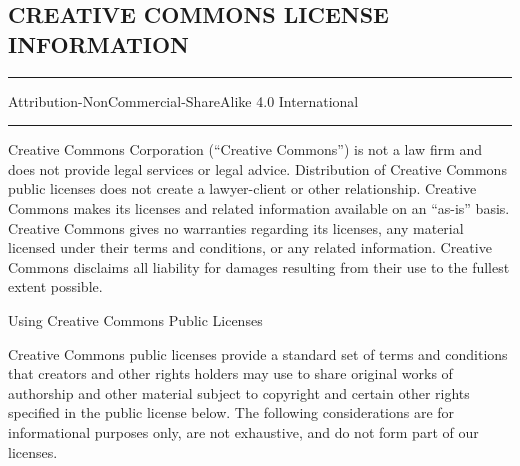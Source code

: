 \documentclass[
]{scrbook}
\begin{document}
\hypertarget{creative-commons-license-information}{%
\subsection{CREATIVE COMMONS LICENSE
INFORMATION}\label{creative-commons-license-information}}

\begin{center}\rule{0.5\linewidth}{0.5pt}\end{center}

Attribution-NonCommercial-ShareAlike 4.0 International

\begin{center}\rule{0.5\linewidth}{0.5pt}\end{center}

Creative Commons Corporation (``Creative Commons'') is not a law firm
and does not provide legal services or legal advice. Distribution of
Creative Commons public licenses does not create a lawyer-client or
other relationship. Creative Commons makes its licenses and related
information available on an ``as-is'' basis. Creative Commons gives no
warranties regarding its licenses, any material licensed under their
terms and conditions, or any related information. Creative Commons
disclaims all liability for damages resulting from their use to the
fullest extent possible.

Using Creative Commons Public Licenses

Creative Commons public licenses provide a standard set of terms and
conditions that creators and other rights holders may use to share
original works of authorship and other material subject to copyright and
certain other rights specified in the public license below. The
following considerations are for informational purposes only, are not
exhaustive, and do not form part of our licenses.
\end{document}
